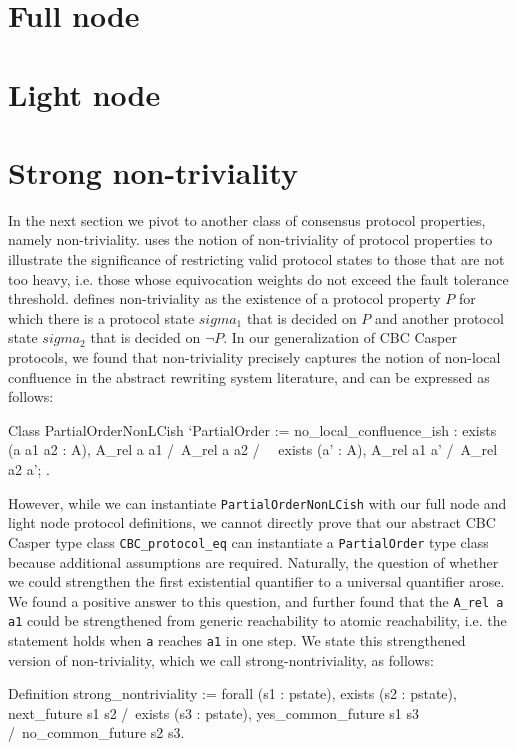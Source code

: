 \documentclass[runningheads]{llncs}
\begin{document}
\section{Full node} 
\label{sec:full}


\section{Light node}
\label{sec:light}


\section{Strong non-triviality} 
In the next section we pivot to another class of consensus protocol properties, namely non-triviality. \cite{CBClight} uses the notion of non-triviality of protocol properties to illustrate the significance of restricting valid protocol states to those that are not too heavy, i.e. those whose equivocation weights do not exceed the fault tolerance threshold. \cite{CBClight} defines non-triviality as the existence of a protocol property $P$ for which there is a protocol state $sigma_1$ that is decided on $P$ and another protocol state $sigma_2$ that is decided on $\neg P$. 
In our generalization of CBC Casper protocols, we found that non-triviality precisely captures the notion of non-local confluence in the abstract rewriting system literature, and can be expressed as follows: 
\begin{coq}
Class PartialOrderNonLCish `{PartialOrder} :=
	{ no_local_confluence_ish : exists (a a1 a2 : A),
		A_rel a a1 /\ A_rel a a2 /\
		~ exists (a' : A), A_rel a1 a' /\ A_rel a2 a';
	}.
\end{coq}
However, while we can instantiate \verb|PartialOrderNonLCish| with our full node and light node protocol definitions, we cannot directly prove that our abstract CBC Casper type class \verb|CBC_protocol_eq| can instantiate a \verb|PartialOrder| type class because additional assumptions are required. 
Naturally, the question of whether we could strengthen the first existential quantifier to a universal quantifier arose. We found a positive answer to this question, and further found that the \verb|A_rel a a1| could be strengthened from generic reachability to atomic reachability, i.e. the statement holds when \verb|a| reaches \verb|a1| in one step. We state this strengthened version of non-triviality, which we call strong-nontriviality, as follows: 
\begin{coq}
Definition strong_nontriviality :=
	forall (s1 : pstate),
	exists (s2 : pstate),
	next_future s1 s2 /\
	exists (s3 : pstate),
	yes_common_future s1 s3
	/\
	no_common_future s2 s3. 
\end{coq}
\end{document}
